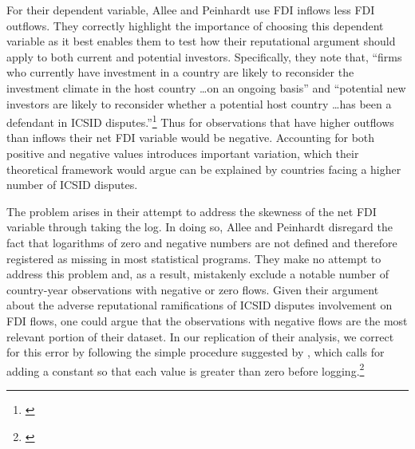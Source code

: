 \documentclass[12pt,onesided]{amsart}
\begin{document}
For their dependent variable, Allee and Peinhardt use FDI inflows less FDI outflows. They correctly highlight the importance of choosing this dependent variable as it best enables them to test how their reputational argument should apply to both current and potential investors. Specifically, they note that, ``firms who currently have investment in a country are likely to reconsider the investment climate in the host country \ldots on an ongoing basis'' and ``potential new investors are likely to reconsider whether a potential host country \ldots has been a defendant in ICSID disputes.''\footnote{\citet[p. 419--420]{allee:peinhardt:2011}} Thus for observations that have higher outflows than inflows their net FDI variable would be negative. Accounting for both positive and negative values introduces important variation, which their theoretical framework would argue can be explained by countries facing a higher number of ICSID disputes. 

The problem arises in their attempt to address the skewness of the net FDI variable through taking the log. In doing so, Allee and Peinhardt disregard the fact that logarithms of zero and negative numbers are not defined and therefore registered as missing in most statistical programs. They make no attempt to address this problem and, as a result, mistakenly exclude a notable number of country-year observations with negative or zero flows. Given their argument about the adverse reputational ramifications of ICSID disputes involvement on FDI flows, one could argue that the observations with negative flows are the most relevant portion of their dataset. In our replication of their analysis, we correct for this error by following the simple procedure suggested by \citeauthor{li:2009}, which calls for adding a constant so that each value is greater than zero before logging.\footnote{\citet{li:2009}} 
\end{document}
